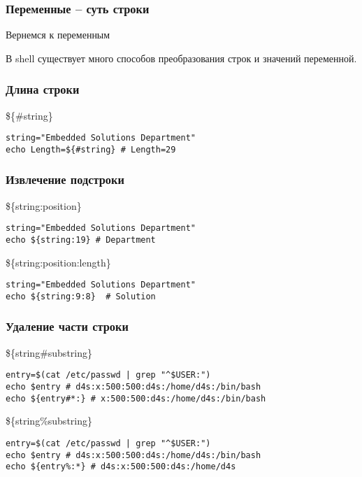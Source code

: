 

\begin{frame}
	\frametitle{Переменные -- суть строки}

	\begin{center}
	\large{Вернемся к переменным}

	\normalsize
	В shell существует много способов преобразования строк и значений переменной.
	\end{center}

\end{frame}


\begin{frame}[fragile]
	\frametitle{Длина строки}

	\begin{block}{\$\{\#string\}}
	\begin{lstlisting}
string="Embedded Solutions Department"
echo Length=${#string} # Length=29
	\end{lstlisting}
	\end{block}

\end{frame}


\begin{frame}[fragile]
	\frametitle{Извлечение подстроки}

	\begin{block}{\$\{string:position\}}
	\begin{lstlisting}
string="Embedded Solutions Department"
echo ${string:19} # Department
	\end{lstlisting}
	\end{block}

	\pause
	\begin{block}{\$\{string:position:length\}}
	\begin{lstlisting}
string="Embedded Solutions Department"
echo ${string:9:8}  # Solution
	\end{lstlisting}
	\end{block}

\end{frame}

\begin{frame}[fragile]
	\frametitle{Удаление части строки}

	\begin{block}{\$\{string\#substring\}}
	\begin{lstlisting}
entry=$(cat /etc/passwd | grep "^$USER:")
echo $entry # d4s:x:500:500:d4s:/home/d4s:/bin/bash
echo ${entry#*:} # x:500:500:d4s:/home/d4s:/bin/bash
	\end{lstlisting}
	\end{block}

	\pause

	\begin{block}{\$\{string\%substring\}}
	\begin{lstlisting}
entry=$(cat /etc/passwd | grep "^$USER:")
echo $entry # d4s:x:500:500:d4s:/home/d4s:/bin/bash
echo ${entry%:*} # d4s:x:500:500:d4s:/home/d4s 
	\end{lstlisting}
	\end{block}



\end{frame}

